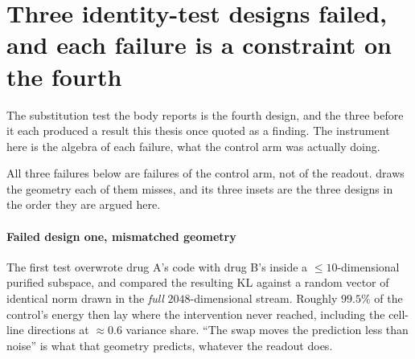 
\framedecl{-}
\section{Three identity-test designs failed, and each failure is a constraint on the fourth}
\label{sec:app-identity}

\begin{question}
The substitution test the body reports is the fourth design, and the three
before it each produced a result this thesis once quoted as a finding. The
instrument here is the algebra of each failure, what the control arm was
actually doing.
\end{question}

\noindent
All three failures below are failures of the control arm, not of the readout.
 draws the geometry each of them misses, and its three insets are
the three designs in the order they are argued here.



\paragraph{Failed design one, mismatched geometry} The first test overwrote drug
A's code with drug B's inside a $\leq 10$-dimensional purified subspace, and
compared the resulting KL against a random vector of identical norm drawn in the
\emph{full} $2048$-dimensional stream. Roughly $99.5\%$ of the control's energy
then lay where the intervention never reached, including the cell-line
directions at $\approx 0.6$ variance share. ``The swap moves the prediction less
than noise'' is what that geometry predicts, whatever the readout does.

